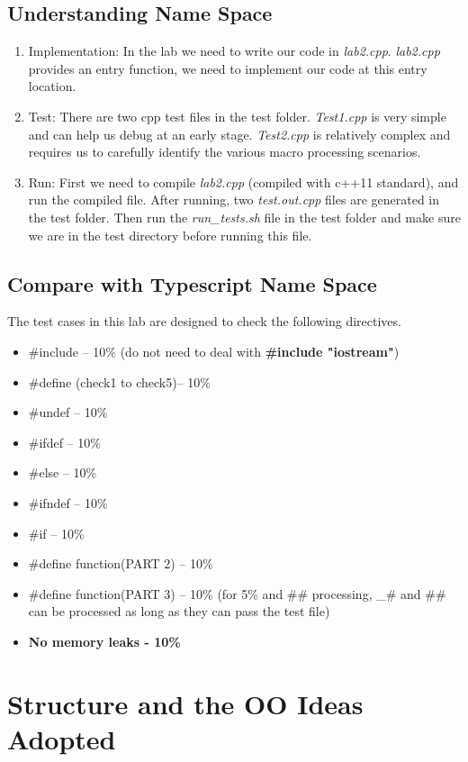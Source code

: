 \documentclass[a4paper]{report}
\begin{document}
\section{Understanding Name Space}
\begin{enumerate}
\item
Implementation: In the lab we need to write our code in \emph{lab2.cpp}. \emph{lab2.cpp} provides an entry function, we need to implement our code at this entry location.
\item
Test: There are two cpp test files in the test folder. \emph{Test1.cpp} is very simple and can help us debug at an early stage. \emph{Test2.cpp} is relatively complex and requires us to carefully identify the various macro processing scenarios.
\item
Run: First we need to compile \emph{lab2.cpp} (compiled with c++11 standard), and run the compiled file. After running, two \emph{test.out.cpp} files are generated in the test folder. Then run the \emph{run\_tests.sh} file in the test folder and make sure we are in the test directory before running this file.
\end{enumerate}
\section{Compare with Typescript Name Space}
The test cases in this lab are designed to check the following directives.
\begin{itemize}
\item \#include – 10\% (do not need to deal with \textbf{\#include "iostream"})
\item \#define (check1 to check5)– 10\%
\item \#undef – 10\%
\item \#ifdef – 10\%
\item \#else – 10\%
\item \#ifndef – 10\%
\item \#if – 10\%
\item \#define function(PART 2) – 10\%
\item \#define function(PART 3) – 10\% (for 5\% and \#\# processing, \_\# and \#\# can be processed as long as they can pass the test file)
\item \textbf{No memory leaks - 10\%}
\end{itemize}

\chapter{Structure and  the OO Ideas Adopted}
\end{document}
